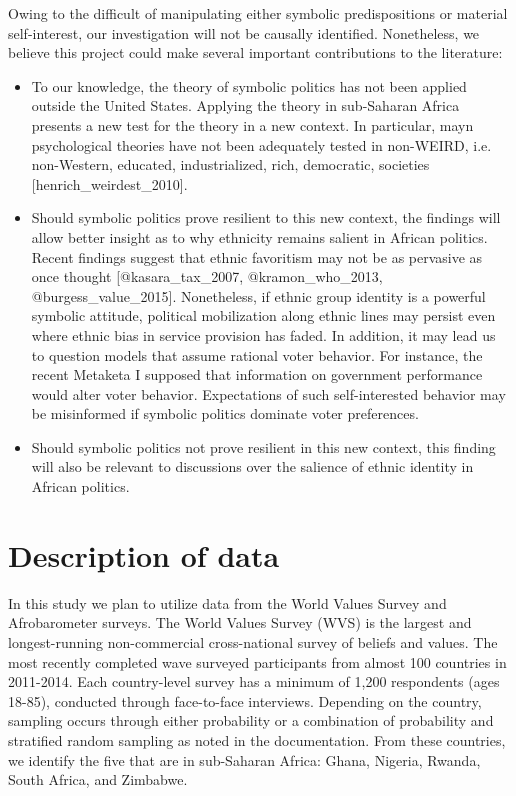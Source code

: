 \documentclass[]{article}
\begin{document}
Owing to the difficult of manipulating either symbolic predispositions
or material self-interest, our investigation will not be causally
identified. Nonetheless, we believe this project could make several
important contributions to the literature:

\begin{itemize}
  \item To our knowledge, the theory of symbolic politics has not been applied outside the United States. Applying the theory in sub-Saharan Africa presents a new test for the theory in a new context. In particular, mayn psychological theories have not been adequately tested in non-WEIRD, i.e. non-Western, educated, industrialized, rich, democratic, societies [henrich_weirdest_2010].
  \item Should symbolic politics prove resilient to this new context, the findings will allow better insight as to why ethnicity remains salient in African politics. Recent findings suggest that ethnic favoritism may not be as pervasive as once thought [@kasara_tax_2007, @kramon_who_2013, @burgess_value_2015]. Nonetheless, if ethnic group identity is a powerful symbolic attitude, political mobilization along ethnic lines may persist even where ethnic bias in service provision has faded. In addition, it may lead us to question models that assume rational voter behavior. For instance, the recent Metaketa I supposed that information on government performance would alter voter behavior. Expectations of such self-interested behavior may be misinformed if symbolic politics dominate voter preferences.
  \item Should symbolic politics not prove resilient in this new context, this finding will also be relevant to discussions over the salience of ethnic identity in African politics.
\end{itemize}

\section{Description of data}\label{description-of-data}

In this study we plan to utilize data from the World Values Survey and
Afrobarometer surveys. The World Values Survey (WVS) is the largest and
longest-running non-commercial cross-national survey of beliefs and
values. The most recently completed wave surveyed participants from
almost 100 countries in 2011-2014. Each country-level survey has a
minimum of 1,200 respondents (ages 18-85), conducted through
face-to-face interviews. Depending on the country, sampling occurs
through either probability or a combination of probability and
stratified random sampling as noted in the documentation. From these
countries, we identify the five that are in sub-Saharan Africa: Ghana,
Nigeria, Rwanda, South Africa, and Zimbabwe.
\end{document}
